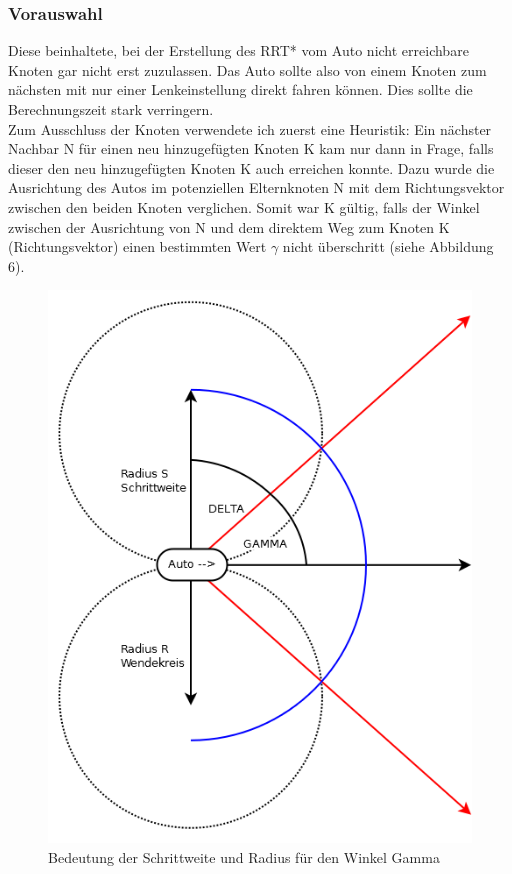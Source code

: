 \subsubsection{Vorauswahl}
\label{sec:Vorauswahl}
Diese beinhaltete, bei der Erstellung des RRT* vom Auto nicht erreichbare Knoten gar nicht erst zuzulassen. Das Auto sollte also von einem Knoten zum nächsten mit nur einer Lenkeinstellung direkt fahren können. Dies sollte die Berechnungszeit stark verringern. \\
Zum Ausschluss der Knoten verwendete ich zuerst eine Heuristik: Ein nächster Nachbar N für einen neu hinzugefügten Knoten K kam nur dann in Frage, falls dieser den neu hinzugefügten Knoten K auch erreichen konnte. Dazu wurde die Ausrichtung des Autos im potenziellen Elternknoten N mit dem Richtungsvektor zwischen den beiden Knoten verglichen. Somit war K gültig, falls der Winkel zwischen der Ausrichtung von N und dem direktem Weg zum Knoten K (Richtungsvektor) einen bestimmten Wert $\gamma$ nicht überschritt (siehe Abbildung 6).
\begin{figure}
\centering
\includegraphics[scale=0.6]{Bilder/AusrichtungGrob.png} 
\caption{Bedeutung der Schrittweite und Radius für den Winkel Gamma}
\end{figure}
